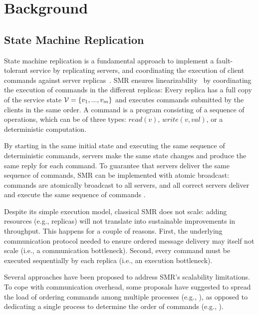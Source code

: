 \section{Background}
\label{sec:background}

\subsection{State Machine Replication}
\label{sec:smr}

State machine replication is a fundamental approach to implement a fault-tolerant service by replicating servers, and coordinating the execution of client commands against server replicas~\cite{Lam78,Sch90}. 
SMR ensures linearizability~\cite{Attiya04} by coordinating the execution of commands in the different replicas: Every replica has a full copy of the service state $\mathcal{V} = \{v_1, ..., v_m\}$ and executes commands submitted by the clients in the same order. A command is a program consisting of a sequence of operations, which can be of three types: $read(v)$, $write(v, val)$, or a deterministic computation.

By starting in the same initial state and executing the same sequence of deterministic commands, servers make the same state changes and produce the same reply for each command. To guarantee that servers deliver the same sequence of commands, SMR can be implemented with atomic broadcast: commands are atomically broadcast to all servers, and all correct servers deliver and execute the same sequence of commands \cite{BJ87b,DSU04}.

Despite its simple execution model, classical SMR does not scale: adding resources (e.g., replicas) will not translate into sustainable improvements in throughput. This happens for a couple of reasons. First, the underlying communication protocol needed to ensure ordered message delivery may itself not scale (i.e., a communication bottleneck). Second, every command must be executed sequentially by each replica (i.e., an execution bottleneck).

Several approaches have been proposed to address SMR's scalability limitations. To cope with communication overhead, some proposals have suggested to spread the load of ordering commands among multiple processes (e.g., \cite{Moraru:2013gw,Mencius,Marandi:2012hb}), as opposed to dedicating a single process to determine the order of commands (e.g., \cite{Lamport:1998ea}).%

